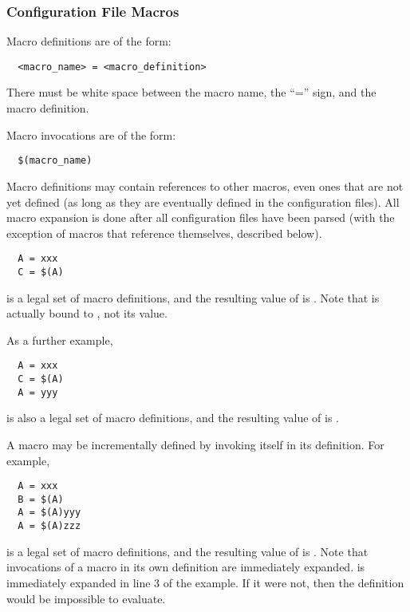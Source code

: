 \subsubsection{\label{sec:Config-File-Macros}Configuration File Macros} 


Macro definitions are of the form:
\begin{verbatim}
  <macro_name> = <macro_definition>
\end{verbatim}

\Note There must be white space between the macro name, the
``='' sign, and the macro definition.

Macro invocations are of the form: 
\begin{verbatim}
  $(macro_name)
\end{verbatim}

Macro definitions may contain references to other macros, even ones
that are not yet defined (as long as they are eventually defined in
the configuration files).
All macro expansion is done after all configuration files have been parsed
(with the exception of macros that reference themselves, described
below). 

\begin{verbatim}
  A = xxx
  C = $(A) 
\end{verbatim}
is a legal set of macro definitions, and the resulting value of 
 is
.
Note that
 is actually bound to 
, not its value.

As a further example,
\begin{verbatim}
  A = xxx
  C = $(A)
  A = yyy
\end{verbatim}
is also a legal set of macro definitions, and the resulting value of
 is .  

A macro may be incrementally defined by invoking itself in its
definition.  For example,
\begin{verbatim}
  A = xxx
  B = $(A)
  A = $(A)yyy
  A = $(A)zzz
\end{verbatim}
is a legal set of macro definitions, and the resulting value of 
is .
Note that invocations of a macro in
its own definition are immediately
expanded.
 is immediately expanded in line 3 of the example.
If it were not, then the definition would be impossible to
evaluate.

